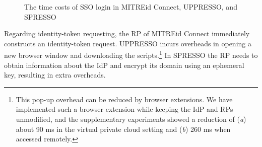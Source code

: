 \begin{figure}[tb]
  \centering
  \caption{The time costs of SSO login in MITREid Connect, UPPRESSO, and SPRESSO}
  \label{fig:evaluation}
\end{figure}

Regarding identity-token requesting, %
the RP of MITREid Connect immediately constructs an identity-token request. %
UPPRESSO incurs overheads in opening a new browser window and downloading the scripts.\footnote{This pop-up overhead can be reduced %
by browser extensions.
We have implemented such a browser extension while keeping the IdP and RPs unmodified, and the supplementary experiments showed a reduction of (\emph{a}) about 90 ms in the virtual private cloud setting and (\emph{b}) 260 ms when accessed remotely.}
In SPRESSO the RP needs to obtain information about the IdP %
and encrypt its domain using an ephemeral key, resulting in extra overheads.


